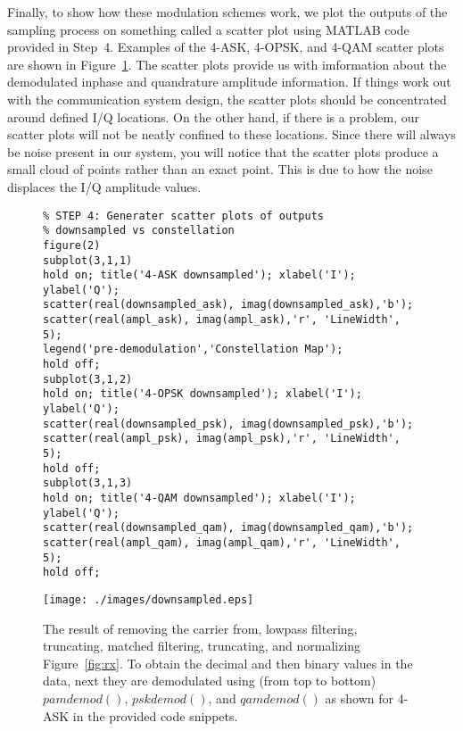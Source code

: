 \documentclass[letterpaper,12pt]{article}
\begin{document}
Finally, to show how these modulation schemes work, we plot the outputs of the sampling process on something called a scatter plot using MATLAB code provided in Step~4.  Examples of the 4-ASK, 4-OPSK, and 4-QAM scatter plots are shown in Figure~\ref{fig:downsamp}.  The scatter plots provide us with imformation about the demodulated inphase and quandrature amplitude information.  If things work out with the communication system design,
the scatter plots should be concentrated around defined I/Q locations.  On the other hand, if there is a problem, our scatter plots will not be neatly confined to these locations.  Since there will always be noise
present in our system, you will notice that the scatter plots produce a small cloud of points rather than an exact point.  This is due to how the noise displaces the I/Q amplitude values.

\begin{figure}[h]
\centering
\begin{minipage}[framed]{0.9\textwidth}
\begin{lstlisting}
% STEP 4: Generater scatter plots of outputs
% downsampled vs constellation
figure(2)
subplot(3,1,1)
hold on; title('4-ASK downsampled'); xlabel('I'); ylabel('Q');
scatter(real(downsampled_ask), imag(downsampled_ask),'b');
scatter(real(ampl_ask), imag(ampl_ask),'r', 'LineWidth', 5);
legend('pre-demodulation','Constellation Map');
hold off;
subplot(3,1,2)
hold on; title('4-OPSK downsampled'); xlabel('I'); ylabel('Q');
scatter(real(downsampled_psk), imag(downsampled_psk),'b');
scatter(real(ampl_psk), imag(ampl_psk),'r', 'LineWidth', 5);
hold off;
subplot(3,1,3)
hold on; title('4-QAM downsampled'); xlabel('I'); ylabel('Q');
scatter(real(downsampled_qam), imag(downsampled_qam),'b');
scatter(real(ampl_qam), imag(ampl_qam),'r', 'LineWidth', 5);
hold off;
\end{lstlisting}
\end{minipage}
\captionsetup{labelformat=empty}
\end{figure}


\begin{figure}[h]
 \centering
 \texttt{[image: ./images/downsampled.eps]}
 \caption{The result of removing the carrier from, lowpass filtering, truncating, matched filtering, truncating, and normalizing Figure~\ref{fig:rx}. To obtain the decimal and then binary values in the data, next they are demodulated using (from top to bottom) $pamdemod()$, $pskdemod()$, and $qamdemod()$ as shown for 4-ASK in the provided code snippets.}
\label{fig:downsamp}
\end{figure}
\end{document}
